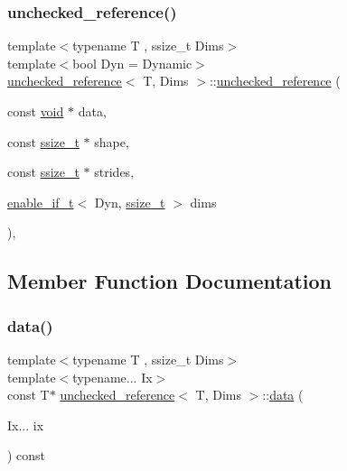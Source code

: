 \subsubsection{\texorpdfstring{unchecked\_reference()}{unchecked\_reference()}\hspace{0.1cm}{\footnotesize\ttfamily [2/2]}}
{\footnotesize\ttfamily template$<$typename T , ssize\+\_\+t Dims$>$ \\
template$<$bool Dyn = Dynamic$>$ \\
\mbox{\hyperlink{classunchecked__reference}{unchecked\+\_\+reference}}$<$ T, Dims $>$\+::\mbox{\hyperlink{classunchecked__reference}{unchecked\+\_\+reference}} (\begin{DoxyParamCaption}\item[{const \mbox{\hyperlink{_s_d_l__opengles2__gl2ext_8h_ae5d8fa23ad07c48bb609509eae494c95}{void}} $\ast$}]{data,  }\item[{const \mbox{\hyperlink{detail_2common_8h_ac430d16fc097b3bf0a7469cfd09decda}{ssize\+\_\+t}} $\ast$}]{shape,  }\item[{const \mbox{\hyperlink{detail_2common_8h_ac430d16fc097b3bf0a7469cfd09decda}{ssize\+\_\+t}} $\ast$}]{strides,  }\item[{\mbox{\hyperlink{detail_2common_8h_a012819c9e8b5e04872a271f50f8b8196}{enable\+\_\+if\+\_\+t}}$<$ Dyn, \mbox{\hyperlink{detail_2common_8h_ac430d16fc097b3bf0a7469cfd09decda}{ssize\+\_\+t}} $>$}]{dims }\end{DoxyParamCaption})\hspace{0.3cm}{\ttfamily [inline]}, {\ttfamily [protected]}}



\subsection{Member Function Documentation}
\mbox{\label{classunchecked__reference_a993c4ac6e09e82442f1d9741765faa97}} 
\subsubsection{\texorpdfstring{data()}{data()}}
{\footnotesize\ttfamily template$<$typename T , ssize\+\_\+t Dims$>$ \\
template$<$typename... Ix$>$ \\
const T$\ast$ \mbox{\hyperlink{classunchecked__reference}{unchecked\+\_\+reference}}$<$ T, Dims $>$\+::\mbox{\hyperlink{_s_d_l__opengl_8h_a2e335d56e2846b0fea47eed068b2d34a}{data}} (\begin{DoxyParamCaption}\item[{Ix...}]{ix }\end{DoxyParamCaption}) const\hspace{0.3cm}{\ttfamily [inline]}}



